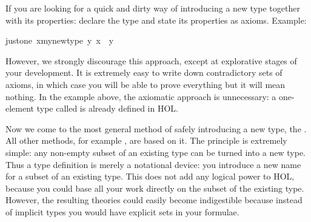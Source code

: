 \begin{isabellebody}
\begin{isamarkuptext}
If you are looking for a quick and dirty way of introducing a new type
together with its properties: declare the type and state its properties as
axioms. Example:%
\end{isamarkuptext}%
\isanewline
just{\isacharunderscore}one{\isacharcolon}\ {\isachardoublequote}{\isasymexists}x{\isacharcolon}{\isacharcolon}my{\isacharunderscore}new{\isacharunderscore}type{\isachardot}\ {\isasymforall}y{\isachardot}\ x\ {\isacharequal}\ y{\isachardoublequote}%
\begin{isamarkuptext}%
\noindent
However, we strongly discourage this approach, except at explorative stages
of your development. It is extremely easy to write down contradictory sets of
axioms, in which case you will be able to prove everything but it will mean
nothing.  In the example above, the axiomatic approach is
unnecessary: a one-element type called  is already defined in HOL.%
\end{isamarkuptext}%
%
%
\begin{isamarkuptext}%
\label{sec:typedef}
Now we come to the most general method of safely introducing a new type, the
. All other methods, for example
, are based on it. The principle is extremely simple:
any non-empty subset of an existing type can be turned into a new type.  Thus
a type definition is merely a notational device: you introduce a new name for
a subset of an existing type. This does not add any logical power to HOL,
because you could base all your work directly on the subset of the existing
type. However, the resulting theories could easily become indigestible
because instead of implicit types you would have explicit sets in your
formulae.


\end{isamarkuptext}
\end{isabellebody}
